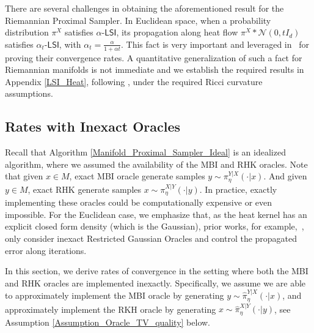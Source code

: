There are several challenges in obtaining the aforementioned result for the Riemannian Proximal Sampler. In Euclidean space, when a probability distribution $\pi^{X}$ satisfies $\alpha$-$\mathsf{LSI}$, 
its propagation along heat flow $\pi^{X} * \mathcal{N}(0, tI_{d})$ satisfies $\alpha_{t}$-$\mathsf{LSI}$, 
with $\alpha_{t} = \frac{\alpha}{1 + \alpha t}$. 
This fact is very important and leveraged in~\cite{chen2022improved} for proving their convergence rates. A quantitative generalization of such a fact for Riemannian manifolds is not immediate and we establish the required results in Appendix \ref{LSI_Heat}, following \cite{collet2008logarithmic}, under the required Ricci curvature assumptions.





\subsection{Rates with Inexact Oracles}\label{Sec_Inexact_oracle}
Recall that Algorithm \ref{Manifold_Proximal_Sampler_Ideal} is an idealized algorithm, 
where we assumed the availability of the MBI and RHK oracles. Note that given $x \in M$, exact MBI oracle generate samples $y \sim \pi_{\eta}^{Y|X}(\cdot|x)$. 
And given $y \in M$, exact RHK generate samples $x \sim \pi_{\eta}^{X|Y}(\cdot|y)$. In practice, exactly implementing these oracles could be computationally expensive or even impossible. For the Euclidean case, we emphasize that, as the heat kernel has an explicit closed form density (which is the Gaussian), prior works, for example,~\cite {fan2023improved}, only consider inexact Restricted Gaussian Oracles and control the propagated error along iterations.


In this section, we derive rates of convergence in the setting where both the MBI and RHK oracles are implemented inexactly. Specifically, we assume we are able to approximately implement the MBI oracle by generating $y \sim \hat{\pi}_{\eta}^{Y|X}(\cdot|x)$, 
and approximately implement the RKH oracle by generating $x \sim \hat{\pi}_{\eta}^{X|Y}(\cdot|y)$, see Assumption \ref{Assumption_Oracle_TV_quality} below.


